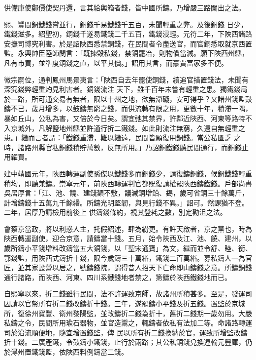 \begin{pinyinscope}
 供備庫使鄭價使契丹還，言其給輿箱者錢，皆中國所鑄。乃增嚴三路闌出之法。



 熙、豐間銅鐵錢嘗並行，銅錢千易鐵錢千五百，未聞輕重之弊。及後銅錢
 日少，鐵錢滋多。紹聖初，銅錢千遂易鐵錢二千五百，鐵錢浸輕。元符二年，下陜西諸路安撫司博究利害。於是詔陜西悉禁銅錢，在民間者令盡送官，而官銅悉取就京西置監。永興帥臣陸師閔言：「既揀毀私錢，禁銅罷冶，則物價當減。願下陜西州縣，凡有市買，並準度銅錢之直，以平其價。」詔用其言，而豪賈富家多不便。



 徽宗嗣位，通判鳳州馬景夷言：「陜西自去年罷使銅錢，續追官措置錢法，未聞有深究錢弊輕重灼見利害者。銅錢流注
 天下，雖千百年未嘗有輕重之患。獨鐵錢局於一路，所可通交易有無者，限以十州之地，欲無滯礙，安可得乎？又諸州錢監鼓鑄不已，歲月增多，以鼓鑄無窮之錢，而供流轉有限之用，更數十年，積滯一隅，暴如丘山，公私為害，又倍於今日矣。謂宜弛其禁界，許鄰近陜西、河東等路特不入京城外，凡解鹽地州縣並許通行折二鐵錢。如此則流注無窮，久遠自無輕重之患。」繼而言者謂：「鐵錢重滯，難以繼遠，民間皆願復用銅錢。當公私匱乏
 之時，諸路州縣官私銅錢積貯萬數，反無所用。」乃詔銅鐵錢聽民間通行，而銅錢止用糴買。



 建中靖國元年，陜西轉運副使孫傑以鐵錢多而銅錢少，請復鑄銅錢，候銅鐵錢輕重稍均，即聽兼鑄。崇寧元年，前陜西轉運判官都貺復請權罷陜西鑄鐵錢。戶部尚書吳居厚言：「江、池、饒、建錢額不敷，議減銅增鉛、錫，歲可省銅三十餘萬斤，計增鑄錢十五萬九千餘緡。所鑄光明堅韌，與見行錢不異。」詔可。然課猶不登。二年，居厚乃請檢用前後上
 供鑄錢條約，視其登耗之數，別定勸沮之法。



 會蔡京當政，將以利惑人主，托假紹述，肆為紛更。有許天啟者，京之黨也，時為陜西轉運副使，迎合京意，請鑄當十錢。五月，始令陜西及江、池、饒、建州，以歲所鑄小平錢增料改鑄當五大銅錢，以「聖宋通寶」為文，繼而並令舒、睦、衡、鄂錢監，用陜西式鑄折十錢，限今歲鑄三十萬緡，鐵錢二百萬緡。募私鑄人一為官匠，並其家設營以居之，號鑄錢院，謂得昔人招天下亡命即山鑄錢之意。所鑄銅錢
 通行諸路，而陜西、河東、四川系鐵錢地者禁之，第鑄於陜西鐵錢地而已。



 自熙寧以來，折二錢雖行民間，法不許運致京師，故諸州所積甚多。至是，發運司因請以官帑所有折二錢改鑄折十錢。三年，遂罷鑄小平錢及折五錢。置監於京城所，復徐州寶豐、衛州黎陽監，並改鑄折二錢為折十，舊折二錢期一歲勿用。大嚴私鑄之令，民間所用瑜石器物，並官造鬻之，輒鑄者依私有法加二等。命諸路轉運司於沿流順便地，隨宜增置錢監，俾
 民以所有折二錢換納於官，運致所增監改鑄折十錢。二廣產鐵，令鼓鑄小鐵錢，止行於兩路；其公私銅錢兌換運輸元豐庫，仍於潯州置鐵錢監，依陜西料例鑄當二錢。




\end{pinyinscope}
